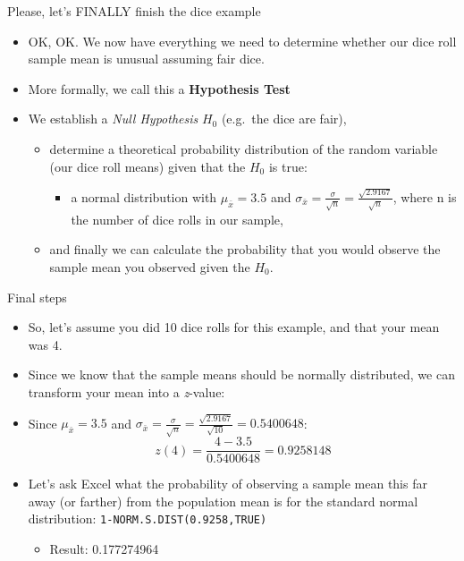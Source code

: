 \begin{frame}{Please, let's FINALLY finish the dice example}

\begin{itemize}
\itemsep1pt\parskip0pt
\item
  OK, OK. We now have everything we need to determine whether our dice
  roll sample mean is unusual assuming fair dice.
\item
  More formally, we call this a \textbf{Hypothesis Test}
\item
  We establish a \emph{Null Hypothesis} \(H_0\) (e.g.~the dice are
  fair),

  \begin{itemize}
  \itemsep1pt\parskip0pt
  \item
    determine a theoretical probability distribution of the random
    variable (our dice roll means) given that the \(H_0\) is true:

    \begin{itemize}
    \itemsep1pt\parskip0pt
    \item
      a normal distribution with \(\mu_{\bar{x}} = 3.5\) and
      \(\sigma_{\bar{x}} = \frac{\sigma}{\sqrt{n}} = \frac{\sqrt{2.9167}}{\sqrt{n}}\),
      where n is the number of dice rolls in our sample,
    \end{itemize}
  \item
    and finally we can calculate the probability that you would observe
    the sample mean you observed given the \(H_0\).
  \end{itemize}
\end{itemize}

\end{frame}

\begin{frame}{Final steps}

\begin{itemize}
\itemsep1pt\parskip0pt
\item
  So, let's assume you did 10 dice rolls for this example, and that your
  mean was 4.
\item
  Since we know that the sample means should be normally distributed, we
  can transform your mean into a \emph{z}-value:
\item
  Since \(\mu_{\bar{x}} = 3.5\) and
  \(\sigma_{\bar{x}} = \frac{\sigma}{\sqrt{n}} = \frac{\sqrt{2.9167}}{\sqrt{10}} = 0.5400648\):
  \[ z(4) = \frac{4-3.5}{0.5400648}=0.9258148\]
\item
  Let's ask Excel what the probability of observing a sample mean this
  far away (or farther) from the population mean is for the standard
  normal distribution: \texttt{1-NORM.S.DIST(0.9258,TRUE)}

  \begin{itemize}
  \itemsep1pt\parskip0pt
  \item
    Result: 0.177274964
  \end{itemize}
\end{itemize}

\end{frame}

